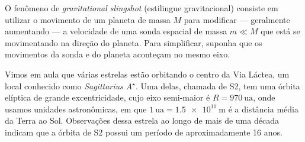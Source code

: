 \documentclass[]{IMTexam}
\begin{document}
\begin{questions}
	\question O fenômeno de \textit{gravitational slingshot} (estilingue gravitacional) consiste em utilizar o movimento de um planeta de massa $ M $ para modificar --- geralmente aumentando --- a velocidade de uma sonda espacial de massa $ m \ll M $ que está se movimentando na direção do planeta. Para simplificar, suponha que os movimentos da sonda e do planeta aconteçam no mesmo eixo.


	\question Vimos em aula que várias estrelas estão orbitando o centro da Via Láctea, um local conhecido como \textit{Sagittarius A$ ^{\star} $}. Uma delas, chamada de S2, tem uma órbita elíptica de grande excentricidade, cujo eixo semi-maior é $ R=\SI{970}{\astronomicalunit} $, onde usamos unidades astronômicas, em que $ \SI{1}{\astronomicalunit}=\SI{1.5e11}{\meter} $ é a distância média da Terra ao Sol. Observações dessa estrela ao longo de mais de uma década indicam que a órbita de S2 possui um período de aproximadamente 16 anos.

\end{questions}
\end{document}
